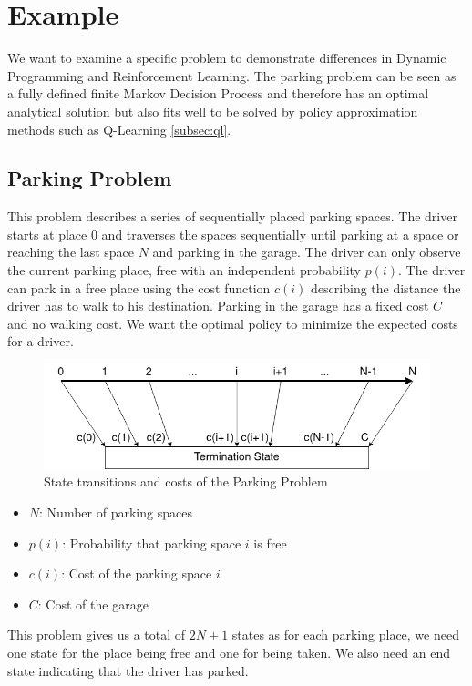 
\chapter{Example}
\label{cha:example}

We want to examine a specific problem to demonstrate differences in Dynamic Programming and Reinforcement Learning. The parking problem \cite{bertsekas2019reinforcement} can be seen as a fully defined finite Markov Decision Process and therefore has an optimal analytical solution but also fits well to be solved by policy approximation methods such as Q-Learning \ref{subsec:ql}.

\section{Parking Problem}
\label{sec:parking_problem}

This problem describes a series of sequentially placed parking spaces. The driver starts at place $0$ and traverses the spaces sequentially until parking at a space or reaching the last space $N$ and parking in the garage. The driver can only observe the current parking place, free with an independent probability $p(i)$. The driver can park in a free place using the cost function $c(i)$ describing the distance the driver has to walk to his destination. Parking in the garage has a fixed cost $C$ and no walking cost. We want the optimal policy to minimize the expected costs for a driver.\\

\begin{figure}[htp]
	\centering
	\includegraphics[scale=0.55]{figures/parking_graphic.png}
	\caption{State transitions and costs of the Parking Problem}
\end{figure}

\begin{itemize}
	\item $N$: Number of parking spaces
	\item $p(i)$: Probability that parking space $i$ is free
	\item $c(i)$: Cost of the parking space $i$
	\item $C$: Cost of the garage
\end{itemize}
This problem gives us a total of $2N+1$ states as for each parking place, we need one state for the place being free and one for being taken. We also need an end state indicating that the driver has parked. 

